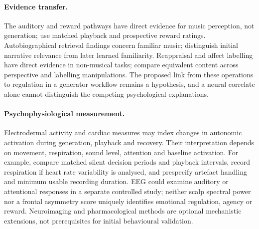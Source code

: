 \documentclass[11pt,a4paper]{article}
\begin{document}
\paragraph{Evidence transfer.} The auditory and reward pathways have direct evidence for music perception, not generation; use matched playback and prospective reward ratings. Autobiographical retrieval findings concern familiar music; distinguish initial narrative relevance from later learned familiarity. Reappraisal and affect labelling have direct evidence in non-musical tasks; compare equivalent content across perspective and labelling manipulations. The proposed link from these operations to regulation in a generator workflow remains a hypothesis, and a neural correlate alone cannot distinguish the competing psychological explanations.

\paragraph{Psychophysiological measurement.} Electrodermal activity and cardiac measures may index changes in autonomic activation during generation, playback and recovery. Their interpretation depends on movement, respiration, sound level, attention and baseline activation. For example, compare matched silent decision periods and playback intervals, record respiration if heart rate variability is analysed, and prespecify artefact handling and minimum usable recording duration. EEG could examine auditory or attentional responses in a separate controlled study; neither scalp spectral power nor a frontal asymmetry score uniquely identifies emotional regulation, agency or reward. Neuroimaging and pharmacological methods are optional mechanistic extensions, not prerequisites for initial behavioural validation.
\end{document}
